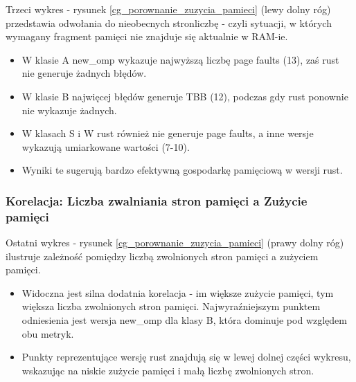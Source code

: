 Trzeci wykres - rysunek \ref{cg_porownanie_zuzycia_pamieci} (lewy dolny róg) przedstawia odwołania do nieobecnych stronliczbę  - czyli sytuacji, w których wymagany fragment pamięci nie znajduje się aktualnie w RAM-ie.
\begin{itemize}
    \item W klasie A new\_omp wykazuje najwyższą liczbę page faults (13), zaś rust nie generuje żadnych błędów.
    \item W klasie B najwięcej błędów generuje TBB (12), podczas gdy rust ponownie nie wykazuje żadnych.
    \item W klasach S i W rust również nie generuje page faults, a inne wersje wykazują umiarkowane wartości (7-10).
    \item Wyniki te sugerują bardzo efektywną gospodarkę pamięciową w wersji rust.
\end{itemize}

\subsubsection{Korelacja: Liczba zwalniania stron pamięci a Zużycie pamięci}
Ostatni wykres - rysunek \ref{cg_porownanie_zuzycia_pamieci} (prawy dolny róg) ilustruje zależność pomiędzy liczbą zwolnionych stron pamięci a zużyciem pamięci.
\begin{itemize}
    \item Widoczna jest silna dodatnia korelacja - im większe zużycie pamięci, tym większa liczba zwolnionych stron pamięci. Najwyraźniejszym punktem odniesienia jest wersja new\_omp dla klasy B, która dominuje pod względem obu metryk.
    \item Punkty reprezentujące wersję rust znajdują się w lewej dolnej części wykresu, wskazując na niskie zużycie pamięci i małą liczbę zwolnionych stron.
\end{itemize}

